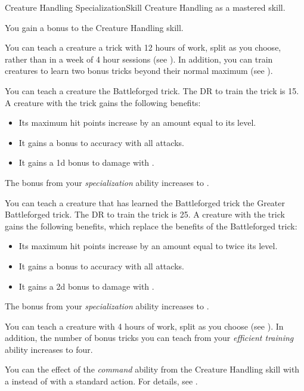     \begin{feat}{Creature Handling Specialization}{Skill}
        \featpre Creature Handling as a mastered skill.

         You gain a  bonus to the Creature Handling skill.

         You can teach a creature a trick with 12 hours of work, split as you choose, rather than in a week of 4 hour sessions (see ).
        In addition, you can train creatures to learn two bonus tricks beyond their normal maximum (see ).

         You can teach a creature the Battleforged trick.
        The DR to train the trick is 15.
        A creature with the trick gains the following benefits:
        \begin{itemize}
            \item Its maximum hit points increase by an amount equal to its level.
            \item It gains a  bonus to accuracy with all attacks.
            \item It gains a \plus1d bonus to damage with .
        \end{itemize}

         The bonus from your \textit{specialization} ability increases to .

         You can teach a creature that has learned the Battleforged trick the Greater Battleforged trick.
        The DR to train the trick is 25.
        A creature with the trick gains the following benefits, which replace the benefits of the Battleforged trick:
        \begin{itemize}
            \item Its maximum hit points increase by an amount equal to twice its level.
            \item It gains a  bonus to accuracy with all attacks.
            \item It gains a \plus2d bonus to damage with .
        \end{itemize}

         The bonus from your \textit{specialization} ability increases to .

         You can teach a creature with 4 hours of work, split as you choose (see ).
        In addition, the number of bonus tricks you can teach from your \textit{efficient training} ability increases to four.

         You can  the effect of the \textit{command} ability from the Creature Handling skill with a  instead of with a standard action.
        For details, see .
    \end{feat}

